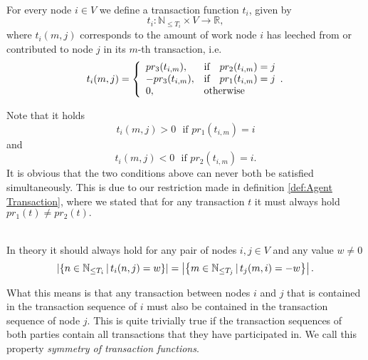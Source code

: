\begin{definition}\ \\
\label{def:Transaction Function}
\noindent{}For every node $i\in{}V$ we define a transaction function $t_i$, given by 
\[
t_i:\mathbb{N}_{\leq{}T_i}\times{}V\rightarrow{}\mathbb{R},
\]
\noindent{}where $t_i(m,j)$ corresponds to the amount of work node $i$ has leeched from or contributed to node $j$ in its $m$-th transaction, i.e. 
\[
t_i(m,j) = \left\lbrace 
\begin{array}{lll}
pr_3(t_{i,m}), & \textrm{if} & pr_2(t_{i,m})=j \\
-pr_3(t_{i,m}), & \textrm{if} & pr_1(t_{i,m})=j \\
0, & \multicolumn{2}{l}{\textrm{otherwise}} \\
\end{array}.
\right.
\]
\end{definition}
\noindent{}Note that it holds 
\[
t_i(m,j)>0\,\,\,\,\textrm{if } pr_1(t_{i,m})=i
\]
\noindent{}and 
\[
t_i(m,j)<0\,\,\,\,\textrm{if } pr_2(t_{i,m})=i.
\]
\noindent{}It is obvious that the two conditions above can never both be satisfied simultaneously. This is due to our restriction made in definition \ref{def:Agent Transaction}, where we stated that for any transaction $t$ it must always hold $pr_1(t)\neq{}pr_2(t).$\vspace{1em}\\ 


\begin{remark}\ \\
\label{rem:Symmetry of Transaction Functions}
\noindent{}In theory it should always hold for any pair of nodes $i,j\in{}V$ and any value $w\neq{}0$  
\[
\left|\left\lbrace{}n\in\mathbb{N}_{\leq{}T_i}\,|\,t_i(n,j)=w\right\rbrace\right| = \left|\left\lbrace{}m\in\mathbb{N}_{\leq{}T_j}\,|\,t_j(m,i)=-w\right\rbrace\right|.\vspace{1em}\\
\]


\noindent{}What this means is that any transaction between nodes $i$ and $j$ that is contained in the transaction sequence of $i$ must also be contained in the transaction sequence of node $j$. This is quite trivially true if the transaction sequences of both parties contain all transactions that they have participated in. We call this property {\it symmetry of transaction functions}.\vspace{1em}\\
\end{remark}

